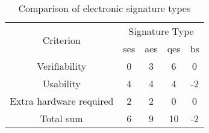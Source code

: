 \begin{table}[H]
	\begin{tabular}{|c|c|c|c|c|} \hline
		\multirow{2}{*}{Criterion} & \multicolumn{4}{|c|}{Signature Type}\\
									& \gls{ses} & \gls{aes} & \gls{qes} & \gls{bs} \\ \cline{1-5}
		Verifiability 			& 0 & 3 & 6 & 0 \\ \hline
		Usability 				& 4 & 4 & 4 & -2 \\ \hline
		Extra hardware required & 2 & 2 & 0 & 0 \\ \hline \hline
		Total sum				& 6 & 9 & 10 & -2 \\ \hline
	\end{tabular}
	\centering
	\caption{Comparison of electronic signature types}
	\label{Tab:comp}
\end{table}